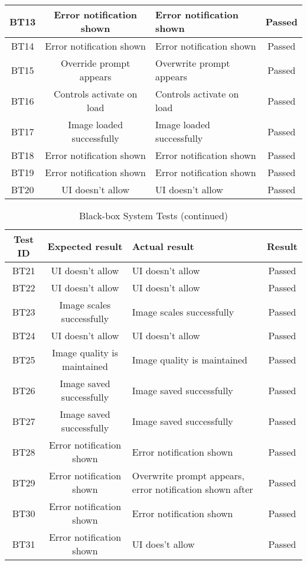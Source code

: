 \documentclass{article}
\begin{document}
\begin{table}[H]
\begin{tabular}{|c|c|p{}||c|}
        BT13 & Error notification shown & Error notification shown & Passed \\
        \hline
        BT14 & Error notification shown & Error notification shown & Passed \\
        \hline
        BT15 & Override prompt appears & Overwrite prompt appears & Passed \\
        \hline
        BT16 & Controls activate on load & Controls activate on load & Passed \\
        \hline
        BT17 & Image loaded successfully & Image loaded successfully & Passed \\
        \hline
        BT18 & Error notification shown & Error notification shown & Passed \\
        \hline
        BT19 & Error notification shown & Error notification shown & Passed \\
        \hline
        BT20 & UI doesn't allow & UI doesn't allow & Passed \\
        \hline
        \end{tabular}
\end{table}
\begin{table}[H]
    \caption{Black-box System Tests (continued)}
    \label{tab:bb}
    \centering
    \begin{tabular}{|c|c|p{}||c|}
        \hline
        \textbf{Test ID} & \textbf{Expected result} & \textbf{Actual result} & \textbf{Result}\\
        \hline
        BT21 & UI doesn't allow & UI doesn't allow & Passed \\
        \hline
        BT22 & UI doesn't allow & UI doesn't allow & Passed \\
        \hline
        BT23 & Image scales successfully & Image scales successfully & Passed \\
        \hline
        BT24 & UI doesn't allow & UI doesn't allow & Passed \\
        \hline
        BT25 & Image quality is maintained & Image quality is maintained & Passed \\
        \hline
        BT26 & Image saved successfully & Image saved successfully & Passed \\
        \hline
        BT27 & Image saved successfully & Image saved successfully & Passed \\
        \hline
        BT28 & Error notification shown & Error notification shown & Passed \\
        \hline
        BT29 & Error notification shown & Overwrite prompt appears, error notification shown after & Passed \\
        \hline
        BT30 & Error notification shown & Error notification shown & Passed \\
        \hline
        BT31 & Error notification shown & UI does't allow & Passed \\
        \hline
    \end{tabular}
\end{table}
\end{document}
